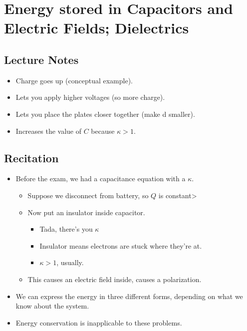 \documentclass[11pt]{article}
\newcommand{\chapterTitle}{Energy stored in Capacitors and Electric Fields; Dielectrics}
\begin{document}
\section{\chapterTitle}


\subsection{Lecture Notes}
\begin{itemize}
    \item Charge goes up (conceptual example).
    \item Lets you apply higher voltages (so more charge).
    \item Lets you place the plates closer together (make d smaller).
    \item Increases the value of $C$ because $\kappa > 1$.
\end{itemize}

\subsection{Recitation}
\begin{itemize}
    \item Before the exam, we had a capacitance equation with a $\kappa$.
    \begin{itemize}
        \item Suppose we disconnect from battery, so $Q$ is constant>
        \item Now put an insulator inside capacitor.
        \begin{itemize}
             \item Tada, there's you $\kappa$
             \item Insulator means electrons are stuck where they're at.
             \item $\kappa > 1$, usually.
         \end{itemize}
         \item This causes an electric field inside, causes a polarization.
    \end{itemize}

    \item We can express the energy in three different forms, depending on what we know about the system.
    \item Energy conservation is inapplicable to these problems.
\end{itemize}
\end{document}
